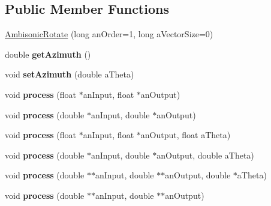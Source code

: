 \subsection*{Public Member Functions}
\begin{DoxyCompactItemize}
\item 
\hyperlink{class_ambisonic_rotate_a27eb54b220b09d45541fb573f295064d}{Ambisonic\-Rotate} (long an\-Order=1, long a\-Vector\-Size=0)
\item 
\hypertarget{class_ambisonic_rotate_ab58d686a7afbc4e2fcfc8c64a259cbd6}{double {\bfseries get\-Azimuth} ()}\label{class_ambisonic_rotate_ab58d686a7afbc4e2fcfc8c64a259cbd6}

\item 
\hypertarget{class_ambisonic_rotate_a1be3ac0a566f765847f986b185b075b1}{void {\bfseries set\-Azimuth} (double a\-Theta)}\label{class_ambisonic_rotate_a1be3ac0a566f765847f986b185b075b1}

\item 
\hypertarget{class_ambisonic_rotate_a2549b8eb124c06e3002e07184ed9f3b1}{void {\bfseries process} (float $\ast$an\-Input, float $\ast$an\-Output)}\label{class_ambisonic_rotate_a2549b8eb124c06e3002e07184ed9f3b1}

\item 
\hypertarget{class_ambisonic_rotate_a1d1d19500c072bb92af70e003fa25334}{void {\bfseries process} (double $\ast$an\-Input, double $\ast$an\-Output)}\label{class_ambisonic_rotate_a1d1d19500c072bb92af70e003fa25334}

\item 
\hypertarget{class_ambisonic_rotate_af8666121fea0acc15c5ef01fc1967ac3}{void {\bfseries process} (float $\ast$an\-Input, float $\ast$an\-Output, float a\-Theta)}\label{class_ambisonic_rotate_af8666121fea0acc15c5ef01fc1967ac3}

\item 
\hypertarget{class_ambisonic_rotate_ab659558bab0a48d1769822775d5357fa}{void {\bfseries process} (double $\ast$an\-Input, double $\ast$an\-Output, double a\-Theta)}\label{class_ambisonic_rotate_ab659558bab0a48d1769822775d5357fa}

\item 
\hypertarget{class_ambisonic_rotate_aa4ab966fcb7fbde95cec1d7790b00455}{void {\bfseries process} (double $\ast$$\ast$an\-Input, double $\ast$$\ast$an\-Output, double $\ast$a\-Theta)}\label{class_ambisonic_rotate_aa4ab966fcb7fbde95cec1d7790b00455}

\item 
\hypertarget{class_ambisonic_rotate_a34edc2c595d8a52f5a2e5dce18a5bc77}{void {\bfseries process} (double $\ast$$\ast$an\-Input, double $\ast$$\ast$an\-Output)}\label{class_ambisonic_rotate_a34edc2c595d8a52f5a2e5dce18a5bc77}


\end{DoxyCompactItemize}
